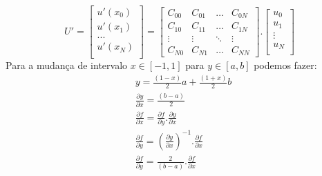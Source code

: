 \begin{equation}
 U'= \begin{bmatrix} 
u'(x_0)\\ 
u'(x_1)\\
...\\
u'(x_N)\\ 
\end{bmatrix} =
\begin{bmatrix}
C_{00} &   C_{01} & \ldots & C_{0N}\\
C_{10}  &  C_{11} & \ldots & C_{1N}\\
\vdots & \vdots & \ddots & \vdots\\
C_{N0}  &   C_{N1}       &\ldots & C_{NN}
\end{bmatrix}. \begin{bmatrix} 
u_{0}\\ 
u_{1}\\
\vdots\\
u_{N}\\ 
\end{bmatrix} 
\end{equation}  
  Para a mudança de intervalo $ x \in [-1,1]$ para $y \in [a,b]$ podemos fazer:
\begin{align}
&y = \frac{(1-x)}{2}a + \frac{(1+x)}{2}b \\
&\frac{\partial y}{\partial x} = \frac{(b -a)}{2}\\
&\frac{\partial f}{\partial x} = \frac{\partial f}{\partial y}. \frac{\partial y}{\partial x} \\
&\frac{\partial f}{\partial y} =  (\frac{\partial y}{\partial x})^{-1}.\frac{\partial f}{\partial x} \\
&\frac{\partial f}{\partial y} = \frac{2}{(b -a)}.\frac{\partial f}{\partial x}
\end{align}
  
